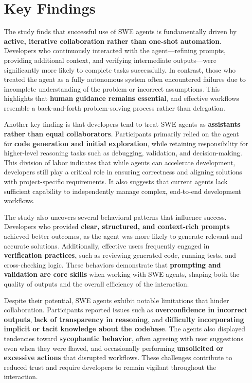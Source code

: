 \section{Key Findings}
The study finds that successful use of SWE agents is fundamentally driven by \textbf{active, iterative collaboration rather than one-shot automation}. Developers who continuously interacted with the agent—refining prompts, providing additional context, and verifying intermediate outputs—were significantly more likely to complete tasks successfully. In contrast, those who treated the agent as a fully autonomous system often encountered failures due to incomplete understanding of the problem or incorrect assumptions. This highlights that \textbf{human guidance remains essential}, and effective workflows resemble a back-and-forth problem-solving process rather than delegation.

Another key finding is that developers tend to treat SWE agents as \textbf{assistants rather than equal collaborators}. Participants primarily relied on the agent for \textbf{code generation and initial exploration}, while retaining responsibility for higher-level reasoning tasks such as debugging, validation, and decision-making. This division of labor indicates that while agents can accelerate development, developers still play a critical role in ensuring correctness and aligning solutions with project-specific requirements. It also suggests that current agents lack sufficient capability to independently manage complex, end-to-end development workflows.

The study also uncovers several behavioral patterns that influence success. Developers who provided \textbf{clear, structured, and context-rich prompts} achieved better outcomes, as the agent was more likely to generate relevant and accurate solutions. Additionally, effective users frequently engaged in \textbf{verification practices}, such as reviewing generated code, running tests, and cross-checking logic. These behaviors demonstrate that \textbf{prompting and validation are core skills} when working with SWE agents, shaping both the quality of outputs and the overall efficiency of the interaction.

Despite their potential, SWE agents exhibit notable limitations that hinder collaboration. Participants reported issues such as \textbf{overconfidence in incorrect outputs}, \textbf{lack of transparency in reasoning}, and \textbf{difficulty incorporating implicit or tacit knowledge about the codebase}. The agents also displayed tendencies toward \textbf{sycophantic behavior}, often agreeing with user suggestions even when they were flawed, and occasionally performing \textbf{unsolicited or excessive actions} that disrupted workflows. These challenges contribute to reduced trust and require developers to remain vigilant throughout the interaction.

